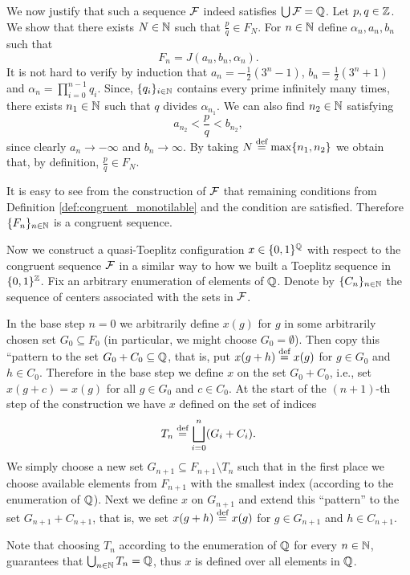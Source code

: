 We now justify that such a sequence $\operatorname{\mathcal{F}}$ indeed satisfies $\bigcup\operatorname{\mathcal{F}}=\mathbb{Q}$.
%
Let $p,q\in\mathbb{Z}$. We show that there exists $N\in\mathbb{N}$ such that $\frac{p}{q}\in F_N$. For $n\in\mathbb{N}$ define $\alpha_n, a_n, b_n$ such that
\[
F_n = J(a_n, b_n, \alpha_n).
\]
It is not hard to verify by induction that $a_n=-\frac{1}{2}(3^n-1)$, $b_n=\frac{1}{2}(3^n+1)$ and $\alpha_n = \prod_{i=0}^{n-1} q_i$. 
Since, $\{q_i\}_{i\in\mathbb{N}}$ contains every prime infinitely many times, there exists $n_1\in\mathbb{N}$ such that $q$ divides $\alpha_{n_1}$.
We can also find $n_2\in \mathbb{N}$ satisfying 
\[
a_{n_2} < \frac{p}{q} <b_{n_2},
\]
since clearly $a_n \to -\infty$ and $b_n \to \infty$.
%
By taking $N\stackrel{\textup{def}}{=}\max\{n_1,n_2\}$ we obtain that, by definition, $\frac{p}{q} \in F_N$.

It is easy to see from the construction of $\operatorname{\mathcal{F}}$ that remaining conditions from Definition \ref{def:congruent_monotilable} and the \Folner condition are satisfied.
Therefore $\{F_n\}_{n\in\mathbb{N}}$ is a congruent \Folner sequence.

\bigskip
Now we construct a quasi-Toeplitz configuration $x\in\{0,1\}^{\mathbb{Q}}$ with respect to the congruent \Folner sequence $\operatorname{\mathcal{F}}$ in a similar way to how we built a Toeplitz sequence in $\{0,1\}^{\mathbb{Z}}$. Fix an arbitrary enumeration of elements of $\mathbb{Q}$. Denote by $\{C_n\}_{n\in\mathbb{N}}$ the sequence of centers associated with the sets in $\operatorname{\mathcal{F}}$. 

In the base step $n=0$ we arbitrarily define $x(g)$ for $g$ in some arbitrarily chosen set $G_0\subseteq F_{0}$ (in particular, we might choose $G_0 = \emptyset$). Then copy this ``pattern to the set $G_0+C_0\subseteq\mathbb{Q}$, that is, put $x(g+h)\stackrel{\textup{def}}{=} x(g)$ for $g\in G_0$ and $h\in C_{0}$. Therefore in the base step we define $x$ on the set $G_0+C_{0}$, i.e., set $x(g+c)=x(g)$ for all $g\in G_0$ and $c\in C_0$. 
%
At the start of the $(n+1)$-th step of the construction we have $x$ defined on the set of indices
\[
T_n\stackrel{\textup{def}}{=} \bigsqcup_{i=0}^n (G_i+C_i).
\]
We simply choose a new set $G_{n+1}\subseteq F_{n+1}\setminus T_n$ such that in the first place we choose available elements from $F_{n+1}$ with the smallest index (according to the enumeration of $\mathbb{Q}$). Next we define $x$ on $G_{n+1}$ and extend this ``pattern'' to the set $G_{n+1}+C_{n+1}$, that is, we set $x(g+h)\stackrel{\textup{def}}{=} x(g)$ for $g\in G_{n+1}$ and $h\in C_{n+1}$.

Note that choosing $T_n$ according to the enumeration of $\mathbb{Q}$  for every $n\in\mathbb{N}$, guarantees that $\bigcup_{n\in\mathbb{N}}T_n=\mathbb{Q}$, thus $x$ is defined over all elements in $\mathbb{Q}$.

